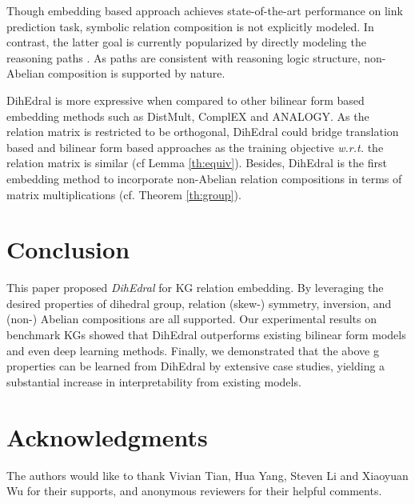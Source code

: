 \documentclass[11pt,a4paper]{article}
\begin{document}
Though embedding based approach achieves state-of-the-art performance on link prediction task, symbolic relation composition is not explicitly modeled. In contrast, the latter goal is currently popularized by directly modeling the reasoning paths \cite{composition_vectors, deeppath, minerva, multi_hop, longterm}. As paths are consistent with reasoning logic structure, non-Abelian composition is supported by nature. 


DihEdral is more expressive when compared to other bilinear form based embedding methods such as DistMult, ComplEX and ANALOGY. As the relation matrix is restricted to be orthogonal, DihEdral could bridge translation based and bilinear form based approaches as the training objective \textit{w.r.t.} the relation matrix is similar (cf Lemma \ref{th:equiv}). Besides, DihEdral is the first embedding method to incorporate non-Abelian relation compositions in terms of matrix multiplications (cf. Theorem \ref{th:group}).

%
 \section{Conclusion}



This paper proposed \textit{DihEdral} for KG relation embedding. By leveraging the desired properties of dihedral group,  relation (skew-) symmetry, inversion, and (non-) Abelian compositions are all supported. Our experimental results on benchmark KGs showed that DihEdral outperforms existing bilinear form models and even deep learning methods.  Finally, we demonstrated that the above g properties can be learned from DihEdral by extensive case studies, yielding a substantial increase in interpretability from existing models.  
\section*{Acknowledgments}
The authors would like to thank Vivian Tian, Hua Yang, Steven Li and Xiaoyuan Wu for their supports, and anonymous reviewers for their helpful comments.



\end{document}
